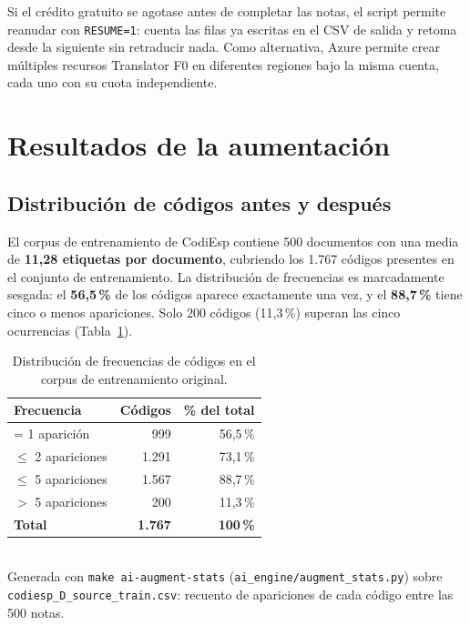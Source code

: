 Si el crédito gratuito se agotase antes de completar las notas, el script permite reanudar con \texttt{RESUME=1}: cuenta las filas ya escritas en el CSV de salida y retoma desde la siguiente sin retraducir nada. Como alternativa, Azure permite crear múltiples recursos Translator F0 en diferentes regiones bajo la misma cuenta, cada uno con su cuota independiente.

\section{Resultados de la aumentación}

\subsection{Distribución de códigos antes y después}

El corpus de entrenamiento de CodiEsp contiene 500 documentos con una media de \textbf{11,28 etiquetas por documento}, cubriendo los 1.767 códigos presentes en el conjunto de entrenamiento. La distribución de frecuencias es marcadamente sesgada: el \textbf{56,5\,\%} de los códigos aparece exactamente una vez, y el \textbf{88,7\,\%} tiene cinco o menos apariciones. Solo 200 códigos (11,3\,\%) superan las cinco ocurrencias (Tabla~\ref{tab:code-dist}).

\begin{table}[h]
\centering
\small
\caption{Distribución de frecuencias de códigos en el corpus de entrenamiento original.}
\label{tab:code-dist}
\begin{tabular}{lrr}
\hline
\textbf{Frecuencia} & \textbf{Códigos} & \textbf{\% del total} \\
\hline
= 1 aparición   & 999  & 56,5\,\% \\
$\leq$ 2 apariciones & 1.291 & 73,1\,\% \\
$\leq$ 5 apariciones & 1.567 & 88,7\,\% \\
$>$ 5 apariciones   & 200  & 11,3\,\% \\
\hline
\textbf{Total}    & \textbf{1.767} & \textbf{100\,\%} \\
\hline
\end{tabular}
\\[4pt]
{\footnotesize Generada con \texttt{make ai-augment-stats} (\texttt{ai\_engine/augment\_stats.py}) sobre \texttt{codiesp\_\allowbreak{}D\_\allowbreak{}source\_\allowbreak{}train.csv}: recuento de apariciones de cada código entre las 500 notas.}
\end{table}

